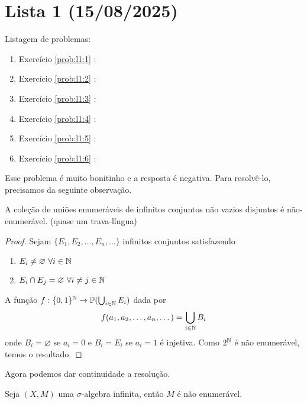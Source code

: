 \section{Lista 1 (15/08/2025)}

Listagem de problemas:
\begin{enumerate}
    \item Exercício \ref{prob:l1:1} : \checkmark
    \item Exercício \ref{prob:l1:2} : \checkmark
    \item Exercício \ref{prob:l1:3} : \checkmark
    \item Exercício \ref{prob:l1:4} : \checkmark
    \item Exercício \ref{prob:l1:5} : \checkmark
    \item Exercício \ref{prob:l1:6} : \checkmark
\end{enumerate}

\begin{problem}
    \label{prob:l1:1}
\end{problem}

Esse problema é muito bonitinho e a resposta é negativa. Para resolvê-lo, precisamos da seguinte observação.
\begin{observation}
    \label{obs:1:enum}
    A coleção de uniões enumeráveis de infinitos conjuntos não vazios disjuntos é não-enumerável. (quase um trava-língua)
\end{observation}
\begin{proof}
    Sejam $\{E_1, E_2, \dots, E_n, \dots\}$ infinitos conjuntos satisfazendo
    \begin{enumerate}
        \item $E_i \neq \varnothing \ \forall i \in \mathbb{N}$ 
        \item $E_i \cap E_j = \varnothing \ \forall i \neq j \in \mathbb{N}$ 
    \end{enumerate}
    A função $f: \{0,1\}^{\mathbb{N}} \rightarrow \mathbb{P}(\bigcup_{i \in \mathbb{N}} E_i)$ dada por
    $$f(a_1, a_2, \dots, a_n, \dots) = \bigcup_{i \in \mathbb{N}} B_i$$
    onde $B_i = \varnothing$ se $a_i = 0$ e $B_i = E_i$ se $a_i = 1$ é injetiva. Como $2^{\mathbb{N}}$ é não enumerável, temos o resultado.
\end{proof}
Agora podemos dar continuidade a resolução.
\begin{prop}
    Seja $(X,M)$ uma $\sigma$-algebra infinita, então $M$ é não enumerável.
\end{prop}


